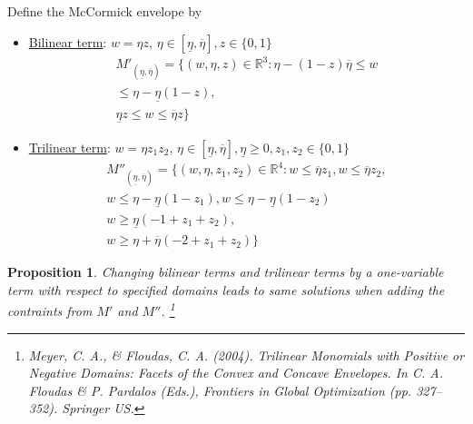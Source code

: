 \documentclass{beamer}
\newcommand{\R}{\mathbb{R}}
\newtheorem{proposition}{Proposition}
\begin{document}
\begin{frame}[allowframebreaks]
	Define the McCormick envelope by
	\begin{itemize}
		\item \underline{Bilinear term}: $w = \eta z$, $\eta \in [\underline{\eta}, \overline{\eta}], z \in \{0, 1\}$
		\begin{equation}\label{eq:mccormick_bi}
			\begin{split}
				M'_{(\underline{\eta}, \overline{\eta})} = \Big\{(w, \eta, z) \in \R^3: \eta - (1 - z) \overline{\eta} \le w \\
				\le \eta - \underline{\eta} (1 - z), \\
				\underline{\eta}z \le w \le \overline{\eta} z\Big\}
			\end{split}
		\end{equation}
	\end{itemize}
	
	\framebreak
	\begin{itemize}
		\item \underline{Trilinear term}: $w = \eta z_1 z_2$, $\eta \in [\underline{\eta}, \overline{\eta}], \underline{\eta} \ge 0,  z_1, z_2 \in \{0, 1\}$
		\begin{equation}\label{eq:mccormick_tri}
			\begin{split}
				M''_{(\underline{\eta}, \overline{\eta})} = \Big\{(w, \eta, z_1, z_2) \in \R^4: w \le \overline{\eta}z_1, w \le \overline{\eta}z_2, \\
				w \le \eta - \underline{\eta} (1 - z_1), w \le \eta - \underline{\eta} (1 - z_2) \\
				w \ge \underline{\eta} (-1 + z_1 + z_2), \\
				w \ge \eta + \overline{\eta} (-2 + z_1 + z_2)\Big\}
			\end{split}
		\end{equation}
	\end{itemize}
	
	\framebreak
	\begin{proposition}
		Changing bilinear terms and trilinear terms by a one-variable term with respect to specified domains leads to same solutions when adding the contraints from $M'$ and $M''$. \footnote{Meyer, C. A., \& Floudas, C. A. (2004). Trilinear Monomials with Positive or Negative Domains: Facets of the Convex and Concave Envelopes. In C. A. Floudas \& P. Pardalos (Eds.), Frontiers in Global Optimization (pp. 327–352). Springer US.
		}
	\end{proposition}
\end{frame}
\end{document}
